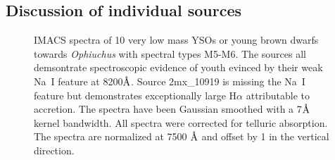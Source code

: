 \begin{landscape}
	
\end{landscape}

\subsection{Discussion of individual sources}
\label{sec_individual_sources}

\begin{figure}[ht!]
\caption{IMACS spectra of 10 very low mass YSOs or young brown dwarfs towards \emph{Ophiuchus} with spectral types M5-M6.  The sources all demsontrate spectroscopic evidence of youth evinced by their weak Na~I feature at 8200$\mbox{\normalfont\AA}$.  Source 2mx\_10919 is missing the Na~I feature but demonstrates exceptionally large H$\alpha$ attributable to accretion.  The spectra have been Gaussian smoothed with a 7$\mbox{\normalfont\AA}$ kernel bandwidth.  All spectra were corrected for telluric absorption.  The spectra are normalized at 7500 $\mbox{\normalfont\AA}$ and offset by 1 in the vertical direction. \label{fig_IMACS_spectra1} }
\centering

\end{figure}
